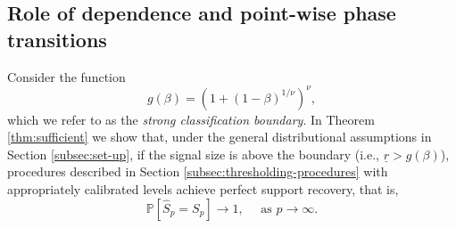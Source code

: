 

\subsection{Role of dependence and point-wise phase transitions}
\label{subsec:role-of-dependence}
Consider the function
\begin{equation} \label{eq:strong-classification-boundary}
    g(\beta) = (1 + (1 - \beta)^{1/\nu})^\nu,
\end{equation}
which we refer to as the {\em strong classification boundary}.
In Theorem \ref{thm:sufficient} we show that, under the general distributional assumptions in Section \ref{subsec:set-up}, if the signal size is above the boundary (i.e., $\underline{r}> g(\beta)$), procedures described in Section \ref{subsec:thresholding-procedures} with appropriately calibrated levels achieve perfect support recovery, that is,
\begin{equation} \label{eq:exact-recovery}
    \mathbb{P}\left[\widehat{S}_p=S_p\right]\longrightarrow 1,\quad \mbox{ as }p\to \infty.
\end{equation}

